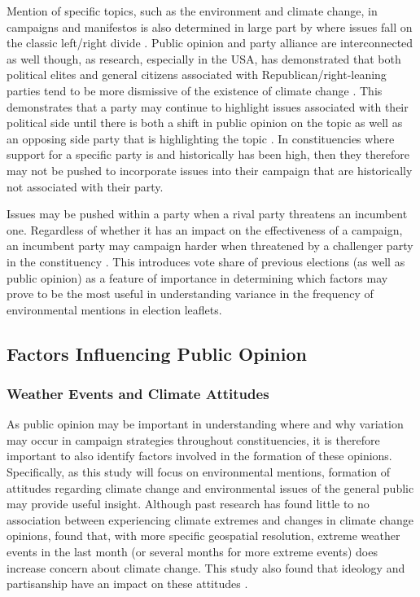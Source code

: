 \documentclass[preprint]{elsarticle} %
\begin{document}
Mention of specific topics, such as the environment and climate change, in campaigns and manifestos is also determined in large part by where issues fall on the classic left/right divide \citep{farstadWhatExplainsVariation2018}. Public opinion and party alliance are interconnected as well though, as research, especially in the USA, has demonstrated that both political elites and general citizens associated with Republican/right-leaning parties tend to be more dismissive of the existence of climate change  \citep{dunlapPoliticalDivideClimate2016,mccrightPoliticizationClimateChange2011}. This demonstrates that a party may continue to highlight issues associated with their political side until there is both a shift in public opinion on the topic as well as an opposing side party that is highlighting the topic \citep{carterPartyPoliticizationEnvironment2006}. In constituencies where support for a specific party is and historically has been high, then they therefore may not be pushed to incorporate issues into their campaign that are historically not associated with their party. 

Issues may be pushed within a party when a rival party threatens an incumbent one. Regardless of whether it has an impact on the effectiveness of a campaign, an incumbent party may campaign harder when threatened by a challenger party in the constituency \citep{pattieIncumbentPartiesIncumbent2017a}. This introduces vote share of previous elections (as well as public opinion) as a feature of importance in determining which factors may prove to be the most useful in understanding variance in the frequency of environmental mentions in election leaflets.


\subsection{Factors Influencing Public Opinion}

\subsubsection{Weather Events and Climate Attitudes}

As public opinion may be important in understanding where and why variation may occur in campaign strategies throughout constituencies, it is therefore important to also identify factors involved in the formation of these opinions. Specifically, as this study will focus on environmental mentions, formation of attitudes regarding climate change and environmental issues of the general public may provide useful insight. Although past research has found little to no association between experiencing climate extremes and changes in climate change opinions, \citet{koniskyExtremeWeatherEvents2016} found that, with more specific geospatial resolution, extreme weather events in the last month (or several months for more extreme events) does increase concern about climate change. This study also found that ideology and partisanship have an impact on these attitudes \citep{koniskyExtremeWeatherEvents2016}. 
\end{document}
